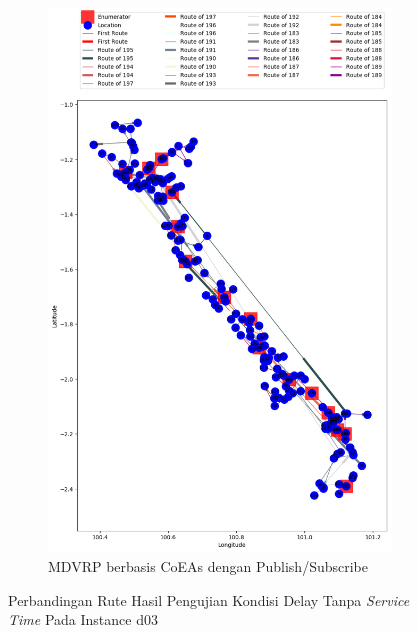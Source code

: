 \begin{figure}[H]\ContinuedFloat
	\centering
	\begin{subfigure}[t]{\textwidth}
		\centering
		\includegraphics[width=\textwidth]{Resources/Images/delayed_3/real_m15_n100_delayed_3_pubsub_coes}
		\caption{MDVRP berbasis CoEAs dengan Publish/Subscribe}
		\label{fig:real_m15_n100_delayed_3_pubsub_coes}
	\end{subfigure}
	\caption{Perbandingan Rute Hasil Pengujian Kondisi Delay Tanpa \textit{Service Time} Pada Instance d03}
	\label{fig:real_m15_n100_delayed_3_contd}
\end{figure}


